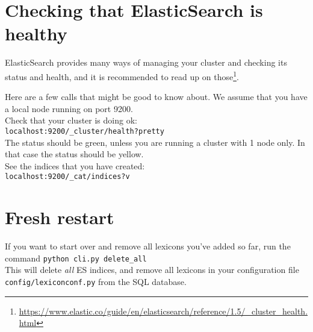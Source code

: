 \documentclass[
12pt, %
a4paper, %
oneside, %
headinclude,footinclude, %
BCOR0mm, %
]{scrartcl}
\begin{document}
\section{Checking that ElasticSearch is healthy}
ElasticSearch provides many ways of managing your cluster and
checking its status and health, and
it is recommended to read up on those\footnote{%
\url{https://www.elastic.co/guide/en/elasticsearch/reference/1.5/_cluster_health.html}}.

Here are a few calls that might be good to know about. We assume
that you have a local node running on port 9200.\\
Check that your cluster is doing ok:\\
\verb|localhost:9200/_cluster/health?pretty|\\
The status should be green, unless you are running a cluster with
1 node only. In that case the status should be yellow.\\
See the indices that you have created:\\
\verb|localhost:9200/_cat/indices?v|\\

\section{Fresh restart}
If you want to start over and remove all lexicons you've added so far, run the command
\verb|python cli.py delete_all|\\
This will delete \textit{all} ES indices, and remove all lexicons in your
configuration file \\
\verb|config/lexiconconf.py| from the SQL database.



%
\end{document}

